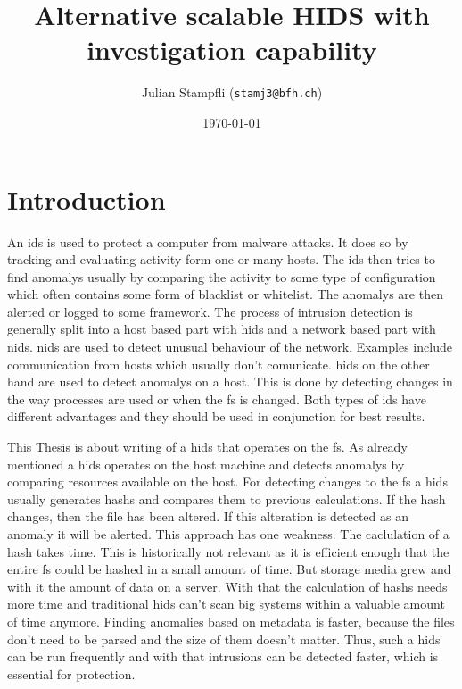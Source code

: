 \documentclass[
	a4paper,					%
	10pt,							%
	twoside,					%
	openright,				%
	notitlepage,			%
	parskip=half,			%
]{scrreprt}					%
\begin{document}
\title{Alternative scalable HIDS with investigation capability}
\date{\today} 
\author{ Julian Stampfli (\texttt{stamj3@bfh.ch}) }
\maketitle
\setcounter{tocdepth}{2}
\tableofcontents
\clearpage

\chapter{Introduction}

An \gls{ids} is used to protect a computer from \gls{malware} attacks. It does so by tracking and evaluating activity form one or many hosts. The \gls{ids} then tries to find \glspl{anomaly} usually by comparing the activity to some type of configuration which often contains some form of blacklist or whitelist. The \glspl{anomaly} are then alerted or logged to some framework. The process of intrusion detection is generally split into a host based part with \gls{hids} and a network based part with \gls{nids}. \gls{nids} are used to detect unusual behaviour of the network. Examples include communication from hosts which usually don't comunicate. \gls{hids} on the other hand are used to detect \glspl{anomaly} on a host. This is done by detecting changes in the way processes are used or when the \gls{fs} is changed. Both types of \gls{ids} have different advantages and they should be used in conjunction for best results. \cite{needed}

This Thesis is about writing of a \gls{hids} that operates on the \gls{fs}. As already mentioned a \gls{hids} operates on the host machine and detects \glspl{anomaly} by comparing resources available on the host. For detecting changes to the \gls{fs} a \gls{hids} usually generates \glspl{hash} and compares them to previous calculations. If the \gls{hash} changes, then the file has been altered. If this alteration is detected as an \gls{anomaly} it will be alerted. This approach has one weakness. The caclulation of a \gls{hash} takes time. \cite{hash:slow} This is historically not relevant as it is efficient enough that the entire \gls{fs} could be hashed in a small amount of time. But storage media grew and with it the amount of data on a server. \cite{bruce:imaging} With that the calculation of \glspl{hash} needs more time and traditional \gls{hids} can't scan big systems within a valuable amount of time anymore. Finding anomalies based on \gls{metadata} is faster, because the files don't need to be parsed and the size of them doesn't matter. Thus, such a \gls{hids} can be run frequently and with that \glspl{intrusion} can be detected faster, which is essential for protection. \cite{inode}
\end{document}

